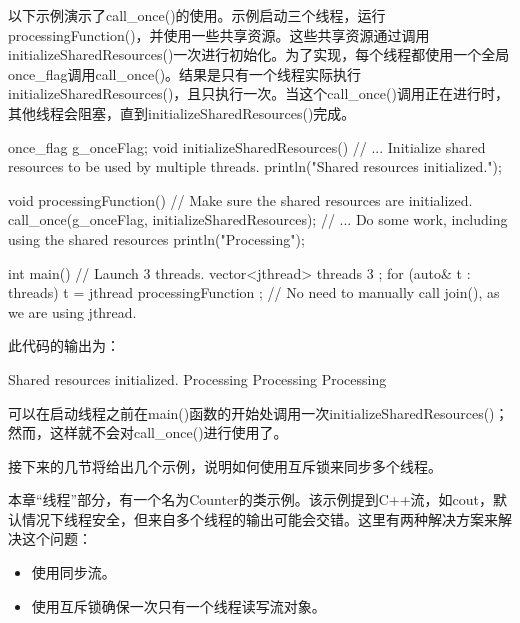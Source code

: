 
以下示例演示了call\_once()的使用。示例启动三个线程，运行processingFunction()，并使用一些共享资源。这些共享资源通过调用initializeSharedResources()一次进行初始化。为了实现，每个线程都使用一个全局once\_flag调用call\_once()。结果是只有一个线程实际执行initializeSharedResources()，且只执行一次。当这个call\_once()调用正在进行时，其他线程会阻塞，直到initializeSharedResources()完成。

\begin{cpp}
once_flag g_onceFlag;
void initializeSharedResources()
{
    // ... Initialize shared resources to be used by multiple threads.
    println("Shared resources initialized.");
}

void processingFunction()
{
    // Make sure the shared resources are initialized.
    call_once(g_onceFlag, initializeSharedResources);
    // ... Do some work, including using the shared resources
    println("Processing");
}

int main()
{
    // Launch 3 threads.
    vector<jthread> threads { 3 };
    for (auto& t : threads) {
        t = jthread { processingFunction };
    }
    // No need to manually call join(), as we are using jthread.
}
\end{cpp}

此代码的输出为：

\begin{shell}
Shared resources initialized.
Processing
Processing
Processing
\end{shell}

可以在启动线程之前在main()函数的开始处调用一次initializeSharedResources()；然而，这样就不会对call\_once()进行使用了。


接下来的几节将给出几个示例，说明如何使用互斥锁来同步多个线程。


本章“线程”部分，有一个名为Counter的类示例。该示例提到C++流，如cout，默认情况下线程安全，但来自多个线程的输出可能会交错。这里有两种解决方案来解决这个问题：

\begin{itemize}
\item
使用同步流。

\item
使用互斥锁确保一次只有一个线程读写流对象。
\end{itemize}


